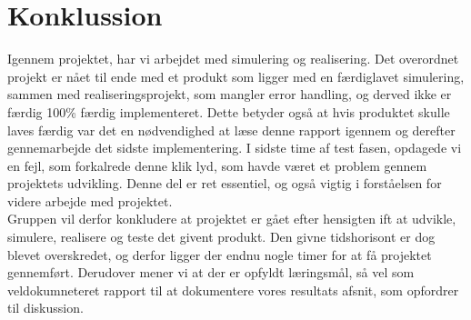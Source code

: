 \graphicspath{{Chapters/Konklussion/}}


\section{Konklussion}
Igennem projektet, har vi arbejdet med simulering og realisering. Det overordnet projekt er nået til ende med et produkt som ligger med en færdiglavet simulering, sammen med realiseringsprojekt, som mangler error handling, og derved ikke er færdig 100\% færdig implementeret. Dette betyder også at hvis produktet skulle laves færdig var det en nødvendighed at læse denne rapport igennem og derefter gennemarbejde det sidste implementering. I sidste time af test fasen, opdagede vi en fejl, som forkalrede denne klik lyd, som havde været et problem gennem projektets udvikling. Denne del er ret essentiel, og også vigtig i forståelsen for videre arbejde med projektet. \\
Gruppen vil derfor konkludere at projektet er gået efter hensigten ift at udvikle, simulere, realisere og teste det givent produkt. Den givne tidshorisont er dog blevet overskredet, og derfor ligger der endnu nogle timer for at få projektet gennemført. Derudover mener vi at der er opfyldt læringsmål, så vel som veldokumneteret rapport til at dokumentere vores resultats afsnit, som opfordrer til diskussion. 
